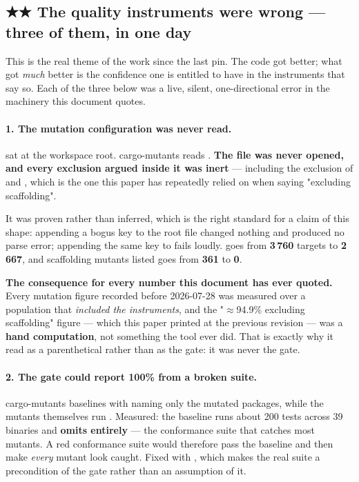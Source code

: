 \documentclass[10.5pt]{article}
\begin{document}
\subsection{\texorpdfstring{★★ The quality instruments were wrong --- three of them, in one day}{The quality instruments were wrong --- three of them, in one day}}
\label{sec:instruments}

This is the real theme of the work since the last pin. The code got better; what got \emph{much}
better is the confidence one is entitled to have in the instruments that say so. Each of the
three below was a live, silent, one-directional error in the machinery this document quotes.

\paragraph{1. The mutation configuration was never read.}
 sat at the workspace root. cargo-mutants reads
. \textbf{The file was never opened, and every exclusion argued inside
it was inert} — including the exclusion of  and , which is the
one this paper has repeatedly relied on when saying "excluding scaffolding".

It was proven rather than inferred, which is the right standard for a claim of this shape:
appending a bogus key to the root file changed nothing and produced no parse error; appending the
same key to  fails loudly.  goes from
\textbf{3\,760} targets to \textbf{2\,667}, and scaffolding mutants listed goes from \textbf{361}
to \textbf{0}.

\textbf{The consequence for every number this document has ever quoted.} Every mutation figure
recorded before 2026-07-28 was measured over a population that \emph{included the instruments},
and the "$\approx$94.9\% excluding scaffolding" figure — which this paper printed at the previous
revision — was a \textbf{hand computation}, not something the tool ever did. That is exactly why
it read as a parenthetical rather than as the gate: it was never the gate.

\paragraph{2. The gate could report 100\% from a broken suite.}
cargo-mutants baselines with  naming only the mutated packages, while the
mutants themselves run . Measured: the baseline runs about 200 tests across 39
binaries and
\textbf{omits  entirely} — the conformance suite that catches most mutants. A
red conformance suite would therefore pass the baseline and then make \emph{every} mutant look
caught. Fixed with , which makes the real suite a precondition of the gate
rather than an assumption of it.
\end{document}
